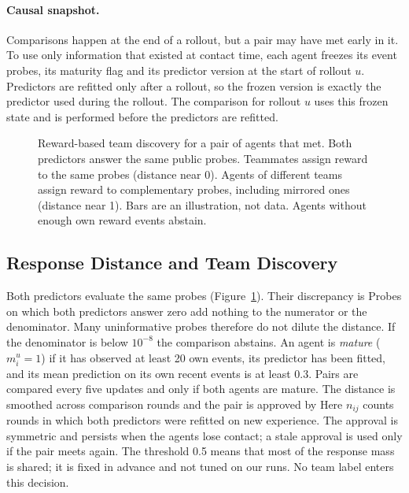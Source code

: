\documentclass{article}
\begin{document}
\paragraph{Causal snapshot.}
Comparisons happen at the end of a rollout, but a pair may have met early in it. To use only information that existed at contact time, each agent freezes its event probes, its maturity flag and its predictor version at the start of rollout $u$. Predictors are refitted only after a rollout, so the frozen version is exactly the predictor used during the rollout. The comparison for rollout $u$ uses this frozen state and is performed before the predictors are refitted.

\begin{figure}[t]
\centering\resizebox{.97\textwidth}{!}{}
\caption{Reward-based team discovery for a pair of agents that met. Both predictors answer the same public probes. Teammates assign reward to the same probes (distance near 0). Agents of different teams assign reward to complementary probes, including mirrored ones (distance near 1). Bars are an illustration, not data. Agents without enough own reward events abstain.}\label{fig:discovery}
\end{figure}

\subsection{Response Distance and Team Discovery}
Both predictors evaluate the same probes (Figure~\ref{fig:discovery}). Their discrepancy is
\DistanceEquation
Probes on which both predictors answer zero add nothing to the numerator or the denominator. Many uninformative probes therefore do not dilute the distance. If the denominator is below $10^{-8}$ the comparison abstains. An agent is \emph{mature} ($m_i^u=1$) if it has observed at least 20 own events, its predictor has been fitted, and its mean prediction on its own recent events is at least 0.3. Pairs are compared every five updates and only if both agents are mature. The distance is smoothed across comparison rounds and the pair is approved by
\ApprovalEquation
Here $n_{ij}$ counts rounds in which both predictors were refitted on new experience. The approval is symmetric and persists when the agents lose contact; a stale approval is used only if the pair meets again. The threshold 0.5 means that most of the response mass is shared; it is fixed in advance and not tuned on our runs. No team label enters this decision.
\end{document}
